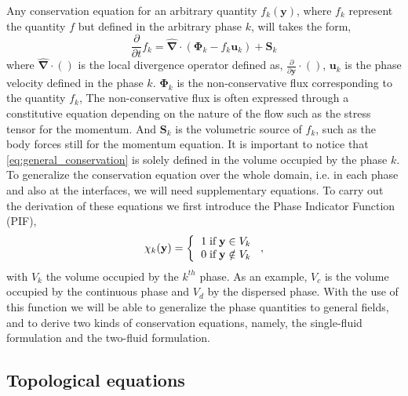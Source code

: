 \documentclass[twocolumn]{My_article}
\newcommand{\nablabh}{\hat{\bm{\nabla}}}
\newcommand{\pddt}{\frac{\partial}{\partial t}}
\begin{document}
Any conservation equation for an arbitrary quantity $f_k(\textbf{y})$, where $f_k$ represent the quantity $f$ but defined in the arbitrary phase $k$, will takes the form,
\begin{equation}
    \pddt f_k
    = \nablabh \cdot \left(
        \bm{\Phi}_k
        - f_k\textbf{u}_k
        \right)
    + \textbf{S}_k
    \label{eq:general_conservation}
\end{equation}
where $\nablabh\cdot()$ is the local divergence operator defined as, $\frac{\partial}{\partial \textbf{y}}\cdot()$, $\textbf{u}_k$ is the phase velocity defined in the phase $k$.
$\bm{\Phi}_k$ is the non-conservative flux corresponding to the quantity $f_k$,
The non-conservative flux is often expressed through a constitutive equation depending on the nature of the flow such as the stress tensor for the momentum.
And $\textbf{S}_k$ is the volumetric source of $f_k$, such as the body forces still for the momentum equation.
It is important to notice that \ref{eq:general_conservation} is solely defined in the volume occupied by the phase $k$.
To generalize the conservation equation over the whole domain, i.e. in each phase and also at the interfaces, we will need supplementary equations.
To carry out the derivation of these equations we first introduce the Phase Indicator Function (PIF),
\begin{equation}
    \chi_k(\textbf{y}) =  \left\{
      \begin{tabular}{cc}
        $1 \;\text{if} \;\textbf{y} \in V_k$\\
        $0 \;\text{if} \;\textbf{y} \notin V_k$
      \end{tabular}
      \right.,
      \label{eq:phase_indicator}
\end{equation}
with $V_k$ the volume occupied by the $k^{th}$ phase.
As an example, $V_c$ is the volume occupied by the continuous phase and $V_d$ by the dispersed phase.
With the use of this function we will be able to generalize the phase quantities to general fields, and to derive two kinds of conservation equations, namely, the single-fluid formulation and the two-fluid formulation.

\subsection{Topological equations}
\end{document}
